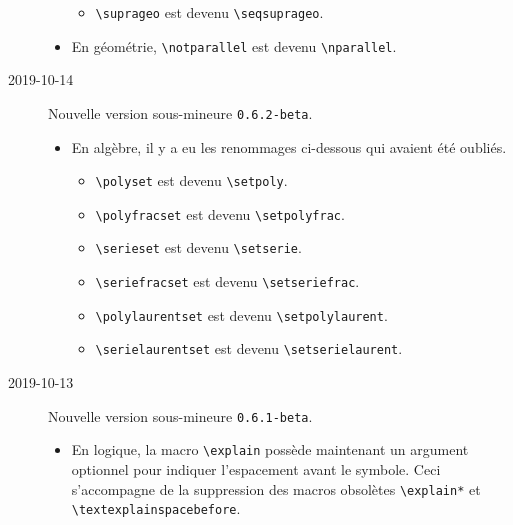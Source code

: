 \documentclass[12pt,a4paper]{article}
\newcommand\env[1]{\texttt{#1}}
\newcommand\macro[1]{\env{\textbackslash{}#1}}
\theoremstyle{definition}
\begin{document}
\begin{description}
\begin{itemize}[itemsep=.5em]
\begin{itemize}[itemsep=.5em]
            \item \macro{suprageo} est devenu \macro{seqsuprageo}.
        \end{itemize}
    
    
    
    
        \item En géométrie, \macro{notparallel} est devenu \macro{nparallel}.
    \end{itemize}


    \medskip
    \item[2019-10-14] Nouvelle version sous-mineure \verb+0.6.2-beta+.
    
    \begin{itemize}[itemsep=.5em]
        \item En algèbre, il y a eu les renommages ci-dessous qui avaient été oubliés.
        \begin{itemize}[itemsep=.5em]
            \item \macro{polyset} est devenu \macro{setpoly}.
    
            \item \macro{polyfracset} est devenu \macro{setpolyfrac}.
    
            \item \macro{serieset} est devenu \macro{setserie}.
    
            \item \macro{seriefracset} est devenu \macro{setseriefrac}.
    
            \item \macro{polylaurentset} est devenu \macro{setpolylaurent}.
    
            \item \macro{serielaurentset} est devenu \macro{setserielaurent}.
        \end{itemize}
    \end{itemize}


    \medskip
    \item[2019-10-13] Nouvelle version sous-mineure \verb+0.6.1-beta+.
    
    \begin{itemize}[itemsep=.5em]
        \item En logique, la macro \macro{explain} possède maintenant un argument optionnel pour indiquer l'espacement avant le symbole.
              Ceci s'accompagne de la suppression des macros obsolètes \macro{explain*} et \macro{textexplainspacebefore}.
    

\end{itemize}
\end{description}
\end{document}
